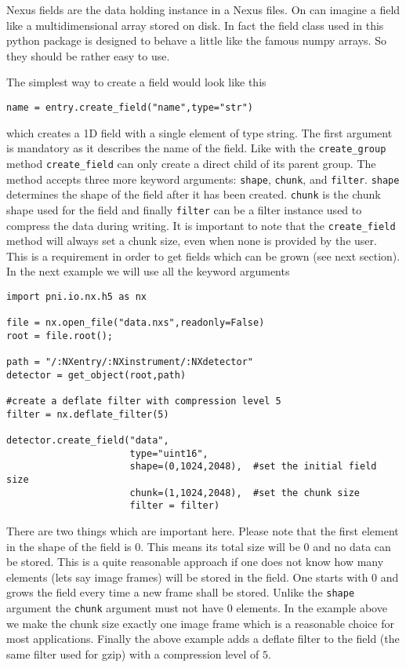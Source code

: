 Nexus fields are the data holding instance in a Nexus files. On can imagine a
field like a multidimensional array stored on disk. In fact the field class 
used in this python package is designed to behave a little like the famous numpy
arrays. So they should be rather easy to use. 

The simplest way to create a field would look like this
\begin{verbatim}
name = entry.create_field("name",type="str")
\end{verbatim}
which creates a 1D field with a single element of type string. The first
argument is mandatory as it describes the name of the field.
Like with the {\tt create\_group} method {\tt create\_field} can only create
a direct child of its parent group. The method accepts three more keyword 
arguments: {\tt shape}, {\tt chunk}, and {\tt filter}. 
{\tt shape} determines the shape of the field after it has been created. 
{\tt chunk} is the chunk shape used for the field and finally {\tt filter} 
can be a filter instance used to compress the data during writing. 
It is important to note that the {\tt create\_field} method will always set a
chunk size, even when none is provided by the user. This is a requirement 
in order to get fields which can be grown (see next section). 
In the next example we will use all the keyword arguments
\begin{verbatim}
import pni.io.nx.h5 as nx

file = nx.open_file("data.nxs",readonly=False)
root = file.root();

path = "/:NXentry/:NXinstrument/:NXdetector"
detector = get_object(root,path)

#create a deflate filter with compression level 5
filter = nx.deflate_filter(5)

detector.create_field("data",
                      type="uint16",
                      shape=(0,1024,2048),  #set the initial field size
                      chunk=(1,1024,2048),  #set the chunk size
                      filter = filter)
\end{verbatim}
There are two things which are important here. Please note that the first
element in the shape of the field is $0$. This means its total size will be $0$
and no data can be stored. This is a quite reasonable approach if one does not 
know how many elements (lets say image frames) will be stored in the field. 
One starts with $0$ and grows the field every time a new frame shall be stored. 
Unlike the {\tt shape} argument the {\tt chunk} argument must not have $0$
elements. In the example above we make the chunk size exactly one image frame
which is a reasonable choice for most applications. 
Finally the above example adds a deflate filter to the field (the same filter
used for gzip) with a compression level of $5$. 

